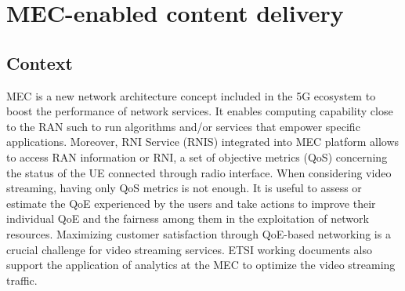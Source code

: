 \chapter{MEC-enabled content delivery}
\label{chap:MEC}

\section{Context}

MEC is a new network architecture concept included in the 5G ecosystem to boost the performance of network services. It enables computing capability close to the RAN such to run algorithms and/or services that empower specific applications. Moreover, RNI Service (RNIS) integrated into MEC platform allows to access RAN information or RNI, a set of objective metrics (QoS) concerning the status of the UE connected through radio interface. When considering video streaming, having only QoS metrics is not enough. It is useful to assess or estimate the QoE experienced by the users and take actions to improve their individual QoE and the fairness among them in the exploitation of network resources. Maximizing customer satisfaction through QoE-based networking is a crucial challenge for video streaming services. ETSI working documents also support the application of analytics at the MEC to optimize the video streaming traffic.

